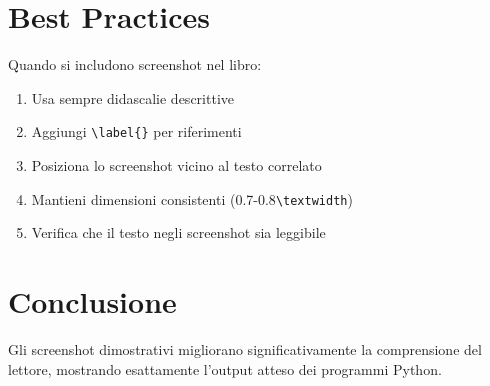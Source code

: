 \section{Best Practices}

Quando si includono screenshot nel libro:

\begin{enumerate}
    \item Usa sempre didascalie descrittive
    \item Aggiungi \texttt{\textbackslash label\{\}} per riferimenti
    \item Posiziona lo screenshot vicino al testo correlato
    \item Mantieni dimensioni consistenti (0.7-0.8\texttt{\textbackslash textwidth})
    \item Verifica che il testo negli screenshot sia leggibile
\end{enumerate}

\section{Conclusione}

Gli screenshot dimostrativi migliorano significativamente la comprensione del lettore, mostrando esattamente l'output atteso dei programmi Python.

